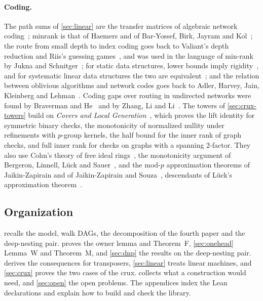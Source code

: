 \paragraph{Coding.} The path sums of \cref{sec:linear} are the transfer matrices of algebraic network coding~\cite{KoetterMedard2003};
minrank is that of Haemers and of Bar-Yossef, Birk, Jayram and Kol~\cite{Haemers1979,BBJK2011}; the route from small depth to
index coding goes back to Valiant's depth reduction and Riis's guessing games~\cite{Valiant1977,Riis2007}, and was used in the
language of min-rank by Jukna and Schnitger~\cite{JuknaSchnitger2011}; for static data structures, lower bounds imply
rigidity~\cite{DGW2019}, and for systematic linear data structures the two are equivalent~\cite{NRR2020}; and the relation between
oblivious algorithms and network codes goes back to Adler, Harvey, Jain, Kleinberg and Lehman~\cite{AHJKL2006}. Coding gaps over routing in
undirected networks were found by Braverman and He~\cite{BravermanHe2026} and by Zhang, Li and Li~\cite{ZhangLiLi2026}. The towers of
\cref{sec:crux-towers} build on \emph{Covers and Local Generation}~\cite{Covers2026}, which proves the lift identity for
symmetric binary checks, the monotonicity of normalized nullity under refinements with $p$-group kernels, the half bound for
the inner rank of graph checks, and full inner rank for checks on graphs with a spanning $2$-factor. They also use Cohn's
theory of free ideal rings~\cite{Cohn2006}, the monotonicity argument of Bergeron, Linnell, Lück and
Sauer~\cite{BLLS2014,Kionke2017}, and the mod-$p$ approximation theorems of Jaikin-Zapirain and of Jaikin-Zapirain and
Souza~\cite{JaikinZapirain2024,JaikinSouza2026}, descendants of Lück's approximation theorem~\cite{Luck1994}.

\subsection{Organization}

 recalls the model, walk DAGs, the decomposition of the fourth paper and the deep-nesting pair.
 proves the owner lemma and Theorem~F, \cref{sec:onehead} Lemma~W and Theorem~M, and \cref{sec:dnp} the results on
the deep-nesting pair.  derives the consequences for transposers, \cref{sec:linear} treats linear machines,
and \cref{sec:crux} proves the two cases of the crux.  collects what a construction would need, and
\cref{sec:open} the open problems. The appendices index the Lean declarations and explain how to build and check the library.

